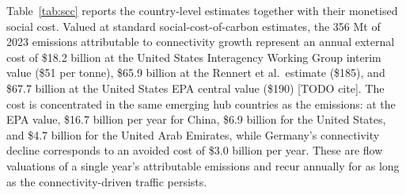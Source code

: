\documentclass[12pt]{article}
\begin{document}
Table~\ref{tab:scc} reports the country-level estimates together with their
monetised social cost. Valued at standard social-cost-of-carbon estimates,
the 356 Mt of 2023 emissions attributable to connectivity growth represent
an annual external cost of \$18.2 billion at the United States Interagency
Working Group interim value (\$51 per tonne), \$65.9 billion at the Rennert
et al.\ estimate (\$185), and \$67.7 billion at the United States EPA
central value (\$190) [TODO cite]. The cost is concentrated in the same
emerging hub countries as the emissions: at the EPA value, \$16.7 billion
per year for China, \$6.9 billion for the United States, and \$4.7 billion
for the United Arab Emirates, while Germany's connectivity decline
corresponds to an avoided cost of \$3.0 billion per year. These are flow
valuations of a single year's attributable emissions and recur annually for
as long as the connectivity-driven traffic persists.
\end{document}
